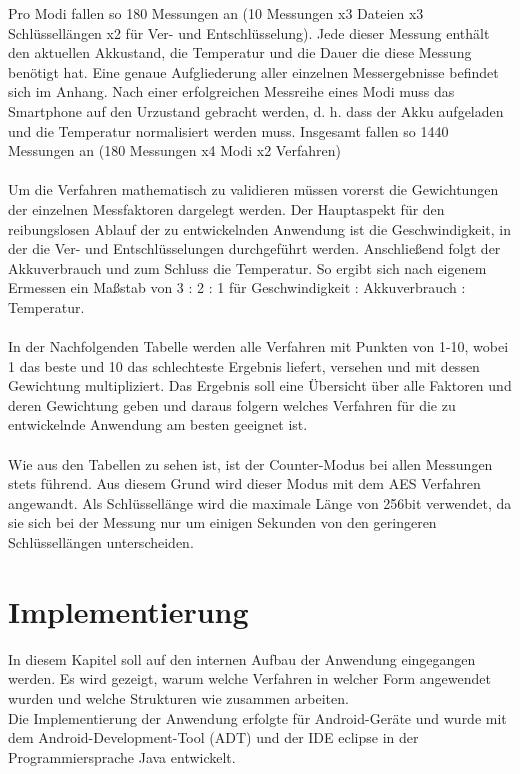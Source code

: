 \documentclass[10pt, a4paper]{scrreprt}
\begin{document}
Pro Modi fallen so 180 Messungen an (10 Messungen x3 Dateien x3 Schlüssellängen x2 für Ver- und Entschlüsselung). Jede dieser Messung enthält den aktuellen Akkustand, die Temperatur und die Dauer die diese Messung benötigt hat. Eine genaue Aufgliederung aller einzelnen Messergebnisse befindet sich im Anhang. Nach einer erfolgreichen Messreihe eines Modi muss das Smartphone auf den Urzustand gebracht werden, d. h. dass der Akku aufgeladen und die Temperatur normalisiert werden muss. Insgesamt fallen so 1440 Messungen an (180 Messungen x4 Modi x2 Verfahren)\\ \\
Um die Verfahren mathematisch zu validieren müssen vorerst die Gewichtungen der einzelnen Messfaktoren dargelegt werden. Der Hauptaspekt für den reibungslosen Ablauf der zu entwickelnden Anwendung ist die Geschwindigkeit, in der die Ver- und Entschlüsselungen durchgeführt werden. Anschließend folgt der Akkuverbrauch und zum Schluss die Temperatur. So ergibt sich nach eigenem Ermessen ein Maßstab von 3 : 2 : 1 für Geschwindigkeit : Akkuverbrauch : Temperatur. \\ \\
In der Nachfolgenden Tabelle werden alle Verfahren mit Punkten von 1-10, wobei 1 das beste und 10 das schlechteste Ergebnis liefert, versehen und mit dessen Gewichtung multipliziert. Das Ergebnis soll eine Übersicht über alle Faktoren und deren Gewichtung geben und daraus folgern welches Verfahren für die zu entwickelnde Anwendung am besten geeignet ist. \\ \\
Wie aus den Tabellen zu sehen ist, ist der Counter-Modus bei allen Messungen stets führend. Aus diesem Grund wird dieser Modus mit dem AES Verfahren angewandt. Als Schlüssellänge wird die maximale Länge von 256bit verwendet, da sie sich bei der Messung nur um einigen Sekunden von den geringeren Schlüssellängen unterscheiden.

\chapter{Implementierung}
In diesem Kapitel soll auf den internen Aufbau der Anwendung eingegangen werden. Es wird gezeigt, warum welche Verfahren in welcher Form angewendet wurden und welche Strukturen wie zusammen arbeiten. \\
Die Implementierung der Anwendung erfolgte für Android-Geräte und wurde mit dem Android-Development-Tool (ADT) und der IDE eclipse in der Programmiersprache Java entwickelt.  
\end{document}
